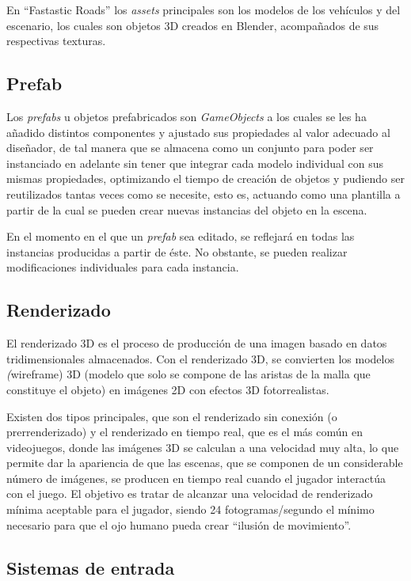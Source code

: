 En ``Fastastic Roads'' los \textit{assets} principales son los modelos de los vehículos y del escenario, los cuales son objetos 3D creados en Blender, acompañados de sus respectivas texturas.

\subsection{Prefab}

Los \textit{prefabs} u objetos prefabricados son \textit{GameObjects} a los cuales se les ha añadido distintos componentes y ajustado sus propiedades al valor adecuado al diseñador, de tal manera que se almacena como un conjunto para poder ser instanciado en adelante sin tener que integrar cada modelo individual con sus mismas propiedades, optimizando el tiempo de creación de objetos y pudiendo ser reutilizados tantas veces como se necesite, esto es, actuando como una plantilla a partir de la cual se pueden crear nuevas instancias del objeto en la escena.

En el momento en el que un \textit{prefab} sea editado, se reflejará en todas las instancias producidas a partir de éste. No obstante, se pueden realizar modificaciones individuales para cada instancia.

\subsection{Renderizado}

El renderizado 3D es el proceso de producción de una imagen basado en datos tridimensionales almacenados. Con el renderizado 3D, se convierten los modelos \textit(wireframe) 3D (modelo que solo se compone de las aristas de la malla que constituye el objeto) en imágenes 2D con efectos 3D fotorrealistas. 

Existen dos tipos principales, que son el renderizado sin conexión (o prerrenderizado) y el renderizado en tiempo real, que es el más común en videojuegos, donde las imágenes 3D se calculan a una velocidad muy alta, lo que permite dar la apariencia de que las escenas, que se componen de un considerable número de imágenes, se producen en tiempo real cuando el jugador interactúa con el juego. El objetivo es tratar de alcanzar una velocidad de renderizado mínima aceptable para el jugador, siendo 24 fotogramas/segundo el mínimo necesario para que el ojo humano pueda crear ``ilusión de movimiento''.

\subsection{Sistemas de entrada}

